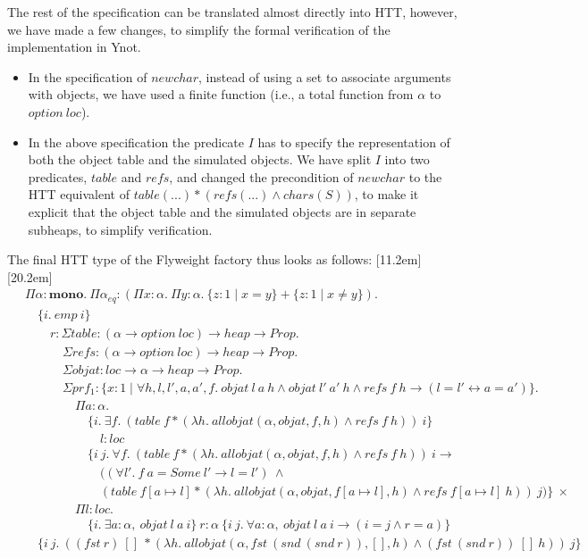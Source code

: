 \documentclass[a4paper,english]{article}
\newcommand{\HEAP}[0]{heap}
\newcommand{\PROP}[0]{Prop}
\newcommand{\MONO}[0]{\mathbf{mono}}
\newcommand{\LOC}[0]{loc}
\newcommand{\OPTION}[0]{option}
\newcommand{\pname}[1]{\texttt{/* #1 */}}
\begin{document}
The rest of the specification can be translated almost directly into HTT,
however, we have made a few changes, to simplify the formal verification of the
implementation in Ynot. 
\begin{itemize}
\item In the specification of $newchar$, instead of using a set to associate
arguments with objects, we have used a finite function (i.e., a total function
from $\alpha$ to $\OPTION\ \LOC$).
\item In the above specification the predicate $I$ has to specify the
representation of both the object table and the simulated objects. We have
split $I$ into two predicates, $table$ and $refs$, and changed the precondition
of $newchar$ to the HTT equivalent of $table(...) * (refs(...) \land
chars(S))$, to make it explicit that the object table and the simulated objects
are in separate subheaps, to simplify verification.
\end{itemize}
The final HTT type of the Flyweight factory thus looks as follows:
\marginnote{\pname{new}}[11.2em]\marginnote{\pname{get}}[20.2em]\begin{align*}
&\Pi \alpha : \MONO.\ \Pi \alpha_{eq} : (\Pi x : \alpha.\ \Pi y : \alpha.\ \{ z : 1 \mid x = y \} + \{ z : 1 \mid x \neq y \}).\\
&\quad\{ i.\ emp\ i \}\\
&\quad\quad r : \Sigma table : (\alpha \rightarrow \OPTION\ \LOC) \rightarrow \HEAP \rightarrow \PROP.\\
&\quad\quad\quad \Sigma refs : (\alpha \rightarrow \OPTION\ \LOC) \rightarrow \HEAP \rightarrow \PROP.\\
&\quad\quad\quad \Sigma objat : \LOC \rightarrow \alpha \rightarrow \HEAP \rightarrow \PROP.\\
&\quad\quad\quad\Sigma prf_1 : \{ x : 1 \mid \forall h, l, l', a, a', f.\ objat\ l\ a\ h \land objat\ l'\ a'\ h \land refs\ f\ h \rightarrow (l = l' \leftrightarrow a = a') \}.\\
&\quad\quad\quad\quad \Pi a : \alpha.\\
&\quad\quad\quad\quad\quad \{ i.\ \exists f.\ (table\ f * (\lambda h.\ allobjat(\alpha, objat, f, h) \land refs\ f\ h))\ i \}\\
&\quad\quad\quad\quad\quad\quad l : \LOC\\
&\quad\quad\quad\quad\quad \{ i\ j.\ \forall f.\ (table\ f * (\lambda h.\ allobjat(\alpha, objat, f, h) \land refs\ f\ h))\ i \rightarrow\\
&\quad\quad\quad\quad\quad\quad ((\forall l'.\ f\ a = Some\ l' \rightarrow l = l')\ \land\\
&\quad\quad\quad\quad\quad\quad (table\ f[a \mapsto l] * (\lambda h.\ allobjat(\alpha, objat, f[a \mapsto l], h) \land refs\ f[a \mapsto l]\ h))\ j) \}\ \times\\
&\quad\quad\quad\quad \Pi l : loc.\\
&\quad\quad\quad\quad\quad \{ i.\ \exists a : \alpha,\ objat\ l\ a\ i \}\ r : \alpha\ \{ i\ j.\ \forall a : \alpha,\ objat\ l\ a\ i \rightarrow (i = j \land r = a) \}\\\
&\quad \{ i\ j.\ ((fst\ r)\ []\ * (\lambda h.\ allobjat(\alpha, fst\ (snd\ (snd\ r)), [], h) \land (fst\ (snd\ r))\ []\ h))\ j \}
\end{align*}
\end{document}
